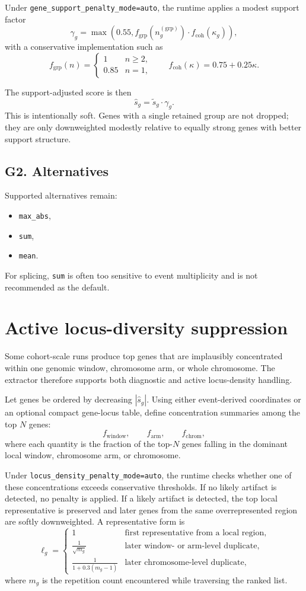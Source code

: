 \documentclass[11pt]{article}
\begin{document}
Under \texttt{gene\_support\_penalty\_mode=auto}, the runtime applies a modest support factor
\[
\gamma_g = \max\!\left(0.55, f_{\mathrm{grp}}(n_g^{(\mathrm{grp})}) \cdot f_{\mathrm{coh}}(\kappa_g)\right),
\]
with a conservative implementation such as
\[
f_{\mathrm{grp}}(n) =
\begin{cases}
1 & n \ge 2,\\
0.85 & n = 1,
\end{cases}
\qquad
f_{\mathrm{coh}}(\kappa) = 0.75 + 0.25\kappa.
\]

The support-adjusted score is then
\[
\widehat{s}_g = \widetilde{s}_g \cdot \gamma_g.
\]
This is intentionally soft. Genes with a single retained group are not dropped; they are only downweighted modestly relative to equally strong genes with better support structure.

\subsection{G2. Alternatives}
Supported alternatives remain:
\begin{itemize}[leftmargin=2em]
\item \texttt{max\_abs},
\item \texttt{sum},
\item \texttt{mean}.
\end{itemize}

For splicing, \texttt{sum} is often too sensitive to event multiplicity and is not recommended as the default.

\section{Active locus-diversity suppression}
Some cohort-scale runs produce top genes that are implausibly concentrated within one genomic window, chromosome arm, or whole chromosome. The extractor therefore supports both diagnostic and active locus-density handling.

Let genes be ordered by decreasing $|\widehat{s}_g|$. Using either event-derived coordinates or an optional compact gene-locus table, define concentration summaries among the top $N$ genes:
\[
f_{\mathrm{window}}, \qquad f_{\mathrm{arm}}, \qquad f_{\mathrm{chrom}},
\]
where each quantity is the fraction of the top-$N$ genes falling in the dominant local window, chromosome arm, or chromosome.

Under \texttt{locus\_density\_penalty\_mode=auto}, the runtime checks whether one of these concentrations exceeds conservative thresholds. If no likely artifact is detected, no penalty is applied. If a likely artifact is detected, the top local representative is preserved and later genes from the same overrepresented region are softly downweighted. A representative form is
\[
\ell_g =
\begin{cases}
1 & \text{first representative from a local region},\\
\frac{1}{\sqrt{m_g}} & \text{later window- or arm-level duplicate},\\
\frac{1}{1 + 0.3(m_g - 1)} & \text{later chromosome-level duplicate},
\end{cases}
\]
where $m_g$ is the repetition count encountered while traversing the ranked list.
\end{document}
